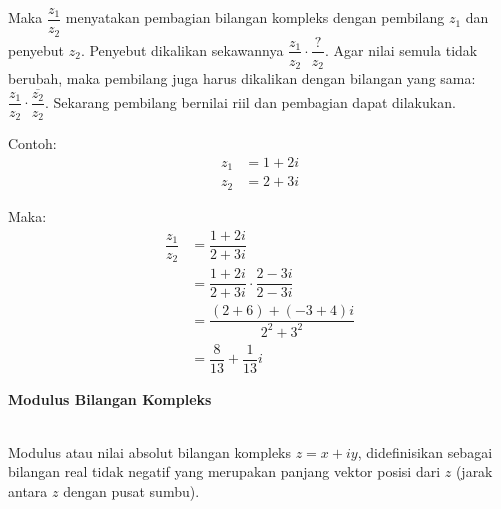 \documentclass{article}
\begin{document}
\begin{enumerate}
          Maka $\dfrac{z_1}{z_2}$ menyatakan pembagian bilangan kompleks dengan pembilang $z_1$ dan penyebut $z_2$. Penyebut dikalikan sekawannya $\dfrac{z_1}{z_2} \cdot \dfrac{?}{z_2}$. Agar nilai semula tidak berubah, maka pembilang juga harus dikalikan dengan bilangan yang sama: $\dfrac{z_1}{z_2} \cdot \dfrac{\overline{z_2}}{z_2}$. Sekarang pembilang bernilai riil dan pembagian dapat dilakukan.

          \newpage
          Contoh:
          \begin{align}
              z_1 & = 1 + 2i
              \nonumber      \\
              z_2 & = 2 + 3i
              \nonumber
          \end{align}

          Maka:
          \begin{align}
              \dfrac{z_1}{z_2} & = \dfrac{1+2i}{2+3i}
              \nonumber                                                        \\
                               & = \dfrac{1+2i}{2+3i} \cdot \dfrac{2-3i}{2-3i}
              \nonumber                                                        \\
                               & = \dfrac{(2+6)+(-3+4)i}{2^2+3^2}
              \nonumber                                                        \\
                               & = \dfrac{8}{13} + \dfrac{1}{13}i
              \nonumber
          \end{align}
\end{enumerate}



\newpage
\begin{center}
    \textbf{Modulus Bilangan Kompleks}
\end{center}
\leavevmode\\

Modulus atau nilai absolut bilangan kompleks $ z = x + iy $, didefinisikan sebagai bilangan real tidak negatif yang merupakan panjang vektor posisi dari $z$ (jarak antara $z$ dengan pusat sumbu).
\\ \\

\\ \\
\end{document}
